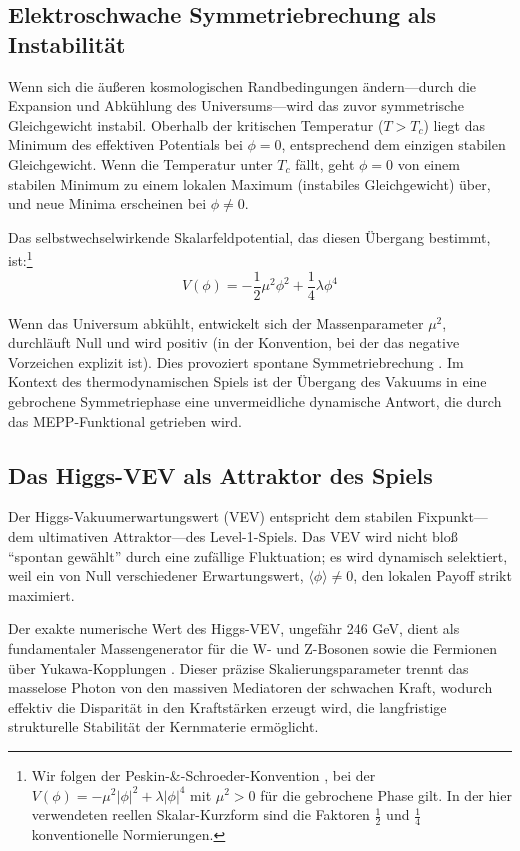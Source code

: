 \documentclass[12pt,a4paper]{article}
\theoremstyle{remark}
\begin{document}
\subsection{Elektroschwache Symmetriebrechung als Instabilit\"at}

Wenn sich die \"au\ss{}eren kosmologischen Randbedingungen \"andern---durch die Expansion und Abk\"uhlung des Universums---wird das zuvor symmetrische Gleichgewicht instabil. Oberhalb der kritischen Temperatur ($T > T_c$) liegt das Minimum des effektiven Potentials bei $\phi = 0$, entsprechend dem einzigen stabilen Gleichgewicht. Wenn die Temperatur unter $T_c$ f\"allt, geht $\phi = 0$ von einem stabilen Minimum zu einem lokalen Maximum (instabiles Gleichgewicht) \"uber, und neue Minima erscheinen bei $\phi \neq 0$.

Das selbstwechselwirkende Skalarfeldpotential, das diesen \"Ubergang bestimmt, ist:\footnote{Wir folgen der Peskin-\&-Schroeder-Konvention \citep{HiggsVEV}, bei der $V(\phi) = -\mu^2 |\phi|^2 + \lambda |\phi|^4$ mit $\mu^2 > 0$ f\"ur die gebrochene Phase gilt. In der hier verwendeten reellen Skalar-Kurzform sind die Faktoren $\frac{1}{2}$ und $\frac{1}{4}$ konventionelle Normierungen.}
\begin{equation}
V(\phi) = -\frac{1}{2}\mu^2 \phi^2 + \frac{1}{4}\lambda \phi^4
\end{equation}

Wenn das Universum abk\"uhlt, entwickelt sich der Massenparameter $\mu^2$, durchl\"auft Null und wird positiv (in der Konvention, bei der das negative Vorzeichen explizit ist). Dies provoziert spontane Symmetriebrechung \citep{HiggsVEV2024}. Im Kontext des thermodynamischen Spiels ist der \"Ubergang des Vakuums in eine gebrochene Symmetriephase eine unvermeidliche dynamische Antwort, die durch das MEPP-Funktional getrieben wird.

\subsection{Das Higgs-VEV als Attraktor des Spiels}

Der Higgs-Vakuumerwartungswert (VEV) entspricht dem stabilen Fixpunkt---dem ultimativen Attraktor---des Level-1-Spiels. Das VEV wird nicht blo\ss{} ``spontan gew\"ahlt'' durch eine zuf\"allige Fluktuation; es wird dynamisch selektiert, weil ein von Null verschiedener Erwartungswert, $\langle\phi\rangle \neq 0$, den lokalen Payoff strikt maximiert.

Der exakte numerische Wert des Higgs-VEV, ungef\"ahr 246 GeV, dient als fundamentaler Massengenerator f\"ur die W- und Z-Bosonen sowie die Fermionen \"uber Yukawa-Kopplungen \citep{HiggsVEV}. Dieser pr\"azise Skalierungsparameter trennt das masselose Photon von den massiven Mediatoren der schwachen Kraft, wodurch effektiv die Disparit\"at in den Kraftst\"arken erzeugt wird, die langfristige strukturelle Stabilit\"at der Kernmaterie erm\"oglicht.
\end{document}
